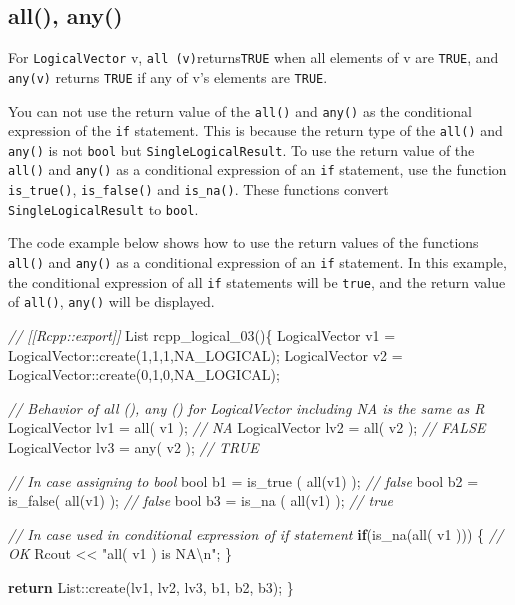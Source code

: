 \documentclass[]{book}
\newenvironment{Shaded}{\begin{snugshade}}{\end{snugshade}}
\newcommand{\DataTypeTok}[1]{\textcolor[rgb]{0.13,0.29,0.53}{#1}}
\newcommand{\DecValTok}[1]{\textcolor[rgb]{0.00,0.00,0.81}{#1}}
\newcommand{\SpecialCharTok}[1]{\textcolor[rgb]{0.00,0.00,0.00}{#1}}
\newcommand{\StringTok}[1]{\textcolor[rgb]{0.31,0.60,0.02}{#1}}
\newcommand{\CommentTok}[1]{\textcolor[rgb]{0.56,0.35,0.01}{\textit{#1}}}
\newcommand{\ControlFlowTok}[1]{\textcolor[rgb]{0.13,0.29,0.53}{\textbf{#1}}}
\newcommand{\NormalTok}[1]{#1}
\theoremstyle{definition}
\theoremstyle{definition}
\theoremstyle{remark}
\begin{document}
\subsection{all(), any()}\label{all-any}

For \texttt{LogicalVector} v, \texttt{all\ (v)}returns\texttt{TRUE} when
all elements of v are \texttt{TRUE}, and \texttt{any(v)} returns
\texttt{TRUE} if any of v's elements are \texttt{TRUE}.

You can not use the return value of the \texttt{all()} and
\texttt{any()} as the conditional expression of the \texttt{if}
statement. This is because the return type of the \texttt{all()} and
\texttt{any()} is not \texttt{bool} but \texttt{SingleLogicalResult}. To
use the return value of the \texttt{all()} and \texttt{any()} as a
conditional expression of an \texttt{if} statement, use the function
\texttt{is\_true()}, \texttt{is\_false()} and \texttt{is\_na()}. These
functions convert \texttt{SingleLogicalResult} to \texttt{bool}.

The code example below shows how to use the return values of the
functions \texttt{all()} and \texttt{any()} as a conditional expression
of an \texttt{if} statement. In this example, the conditional expression
of all \texttt{if} statements will be \texttt{true}, and the return
value of \texttt{all()}, \texttt{any()} will be displayed.

\begin{Shaded}
\begin{Highlighting}[]
\CommentTok{// [[Rcpp::export]]}
\NormalTok{List rcpp_logical_03()\{}
\NormalTok{  LogicalVector v1 = LogicalVector::create(}\DecValTok{1}\NormalTok{,}\DecValTok{1}\NormalTok{,}\DecValTok{1}\NormalTok{,NA_LOGICAL);}
\NormalTok{  LogicalVector v2 = LogicalVector::create(}\DecValTok{0}\NormalTok{,}\DecValTok{1}\NormalTok{,}\DecValTok{0}\NormalTok{,NA_LOGICAL);}

  \CommentTok{// Behavior of all (), any () for LogicalVector including NA is the same as R}
\NormalTok{  LogicalVector lv1 = all( v1 );   }\CommentTok{// NA}
\NormalTok{  LogicalVector lv2 = all( v2 );   }\CommentTok{// FALSE}
\NormalTok{  LogicalVector lv3 = any( v2 ); }\CommentTok{// TRUE}

  \CommentTok{// In case assigning to bool}
  \DataTypeTok{bool}\NormalTok{ b1 = is_true ( all(v1) );  }\CommentTok{// false}
  \DataTypeTok{bool}\NormalTok{ b2 = is_false( all(v1) );  }\CommentTok{// false}
  \DataTypeTok{bool}\NormalTok{ b3 = is_na   ( all(v1) );  }\CommentTok{// true}

  \CommentTok{// In case used in conditional expression of if statement}
  \ControlFlowTok{if}\NormalTok{(is_na(all( v1 ))) \{ }\CommentTok{// OK}
\NormalTok{    Rcout << }\StringTok{"all( v1 ) is NA}\SpecialCharTok{\textbackslash{}n}\StringTok{"}\NormalTok{;}
\NormalTok{  \}}

  \ControlFlowTok{return}\NormalTok{ List::create(lv1, lv2, lv3, b1, b2, b3);}
\NormalTok{\}}
\end{Highlighting}
\end{Shaded}
\end{document}
